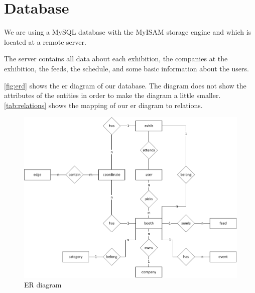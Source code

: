 \section{Database}
We are using a MySQL database with the MyISAM storage engine and which is located at a remote server. 

The server contains all data about each exhibition, the companies at the exhibition, the feeds, the schedule, and some basic information about the users.

\autoref{fig:erd} shows the \ac{er} diagram of our database. The diagram does not show the attributes of the entities in order to make the diagram a little smaller. \autoref{tab:relations} shows the mapping of our \ac{er} diagram to relations.

\begin{figure}[H]
\centering
\includegraphics[page=1,width=1\linewidth]{img/sw7ERD.pdf}
\caption{ER diagram}
\label{fig:erd}
\end{figure}

\newcommand{\relation}[1]{[\{ #1 \}]\\}


